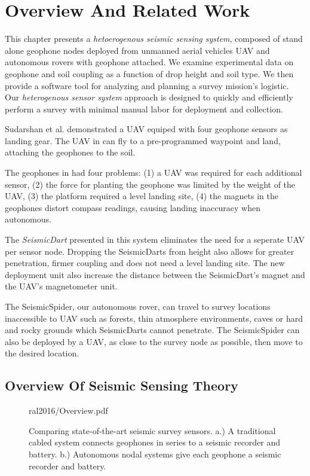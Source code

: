 \section[Related Work]{Overview And Related Work}

This chapter presents a \emph{hetoerogenous seismic sensing system}, composed of stand alone geophone nodes deployed from unmanned aerial vehicles {UAV} and autonomous rovers with geophone attached.
We examine experimental data on geophone and soil coupling as a function of drop height and soil type.
We then provide a software tool for analyzing and planning a survey mission's logistic.
Our \emph{heterogenous sensor system} approach is designed to quickly and efficiently perform a survey with minimal manual labor for deployment and collection.

Sudarshan et al. \cite{sudarshan2015using} demonstrated a UAV equiped with four geophone sensors as landing gear.
The UAV in \cite{sudarshan2015using} can fly to a pre-programmed waypoint and land, attaching the geophones to the soil.

The geophones in  \cite{sudarshan2015using} had four problems:
(1) a UAV was required for each additional sensor,
(2) the force for planting the geophone was limited by the weight of the UAV,
(3) the platform required a level landing site,
(4) the magnets in the geophones distort compass readings, causing landing inaccuracy when autonomous.

The \emph{SeismicDart} presented in this system eliminates the need for a seperate UAV per sensor node.
Dropping the SeismicDarts from height also allows for greater penetration, firmer coupling and does not need a level landing site.
The new deployment unit also increase the distance between the SeismicDart's magnet and the UAV's magnetometer unit.

The SeismicSpider, our autonomous rover, can travel to survey locations inaccessible to UAV such as forests, thin atmosphere environments, caves or hard and rocky grounds which SeismicDarts cannot penetrate.
The SeismicSpider can also be deployed by a UAV, as close to the survey node as possible, then move to the desired location.

\subsection{Overview Of Seismic Sensing Theory}

\begin{figure}
	\centering
	\begin{overpic}[width=\columnwidth]{ral2016/Overview.pdf}\end{overpic}
	\caption{\label{fig:sensor_types}
	 Comparing state-of-the-art seismic survey sensors. a.) A traditional cabled system connects geophones in series to a seismic recorder and battery. b.) Autonomous nodal systems give each geophone a seismic recorder and battery.}
\end{figure}



